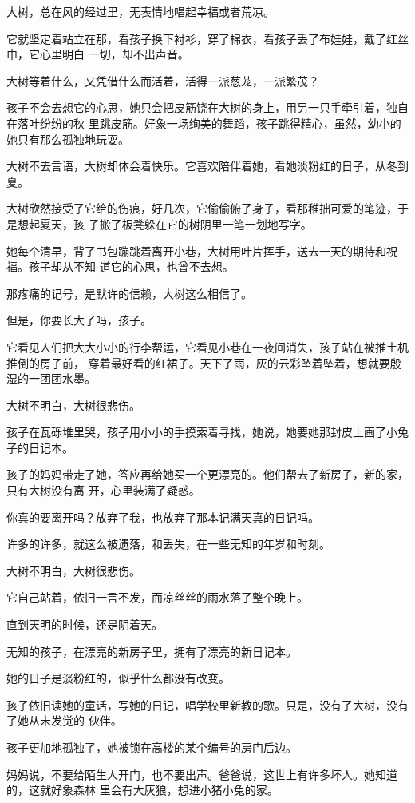 		大树，总在风的经过里，无表情地唱起幸福或者荒凉。

		它就坚定着站立在那，看孩子换下衬衫，穿了棉衣，看孩子丢了布娃娃，戴了红丝巾，它心里明白
	一切，却不出声音。

		大树等着什么，又凭借什么而活着，活得一派葱茏，一派繁茂？

		孩子不会去想它的心思，她只会把皮筋饶在大树的身上，用另一只手牵引着，独自在落叶纷纷的秋
	里跳皮筋。好象一场绚美的舞蹈，孩子跳得精心，虽然，幼小的她只有那么孤独地玩耍。

		大树不去言语，大树却体会着快乐。它喜欢陪伴着她，看她淡粉红的日子，从冬到夏。

		大树欣然接受了它给的伤痕，好几次，它偷偷俯了身子，看那稚拙可爱的笔迹，于是想起夏天，孩
	子搬了板凳躲在它的树阴里一笔一划地写字。

		她每个清早，背了书包蹦跳着离开小巷，大树用叶片挥手，送去一天的期待和祝福。孩子却从不知
	道它的心思，也曾不去想。

		那疼痛的记号，是默许的信赖，大树这么相信了。

		但是，你要长大了吗，孩子。

		它看见人们把大大小小的行李帮运，它看见小巷在一夜间消失，孩子站在被推土机推倒的房子前，
	穿着最好看的红裙子。天下了雨，灰的云彩坠着坠着，想就要殷湿的一团团水墨。


		大树不明白，大树很悲伤。

		孩子在瓦砾堆里哭，孩子用小小的手摸索着寻找，她说，她要她那封皮上画了小兔子的日记本。

		孩子的妈妈带走了她，答应再给她买一个更漂亮的。他们帮去了新房子，新的家，只有大树没有离
	开，心里装满了疑惑。

		你真的要离开吗？放弃了我，也放弃了那本记满天真的日记吗。

		许多的许多，就这么被遗落，和丢失，在一些无知的年岁和时刻。


		大树不明白，大树很悲伤。

		它自己站着，依旧一言不发，而凉丝丝的雨水落了整个晚上。

		直到天明的时候，还是阴着天。


		无知的孩子，在漂亮的新房子里，拥有了漂亮的新日记本。

		她的日子是淡粉红的，似乎什么都没有改变。

		孩子依旧读她的童话，写她的日记，唱学校里新教的歌。只是，没有了大树，没有了她从未发觉的
	伙伴。


		孩子更加地孤独了，她被锁在高楼的某个编号的房门后边。

		妈妈说，不要给陌生人开门，也不要出声。爸爸说，这世上有许多坏人。她知道的，这就好象森林
	里会有大灰狼，想进小猪小兔的家。

